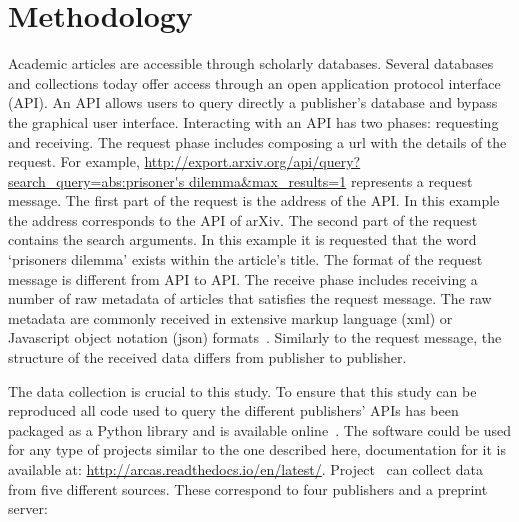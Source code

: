 \documentclass{article}
\theoremstyle{definition}
\begin{document}
\section{Methodology}\label{section:methodology}

Academic articles are accessible through scholarly databases. Several databases
and collections today offer access through an open application protocol
interface (API). An API allows users to query directly a publisher's database and
bypass the graphical user interface. Interacting with an API has two phases:
requesting and receiving. The request phase includes composing a url with the
details of the request. For example,
\url{http://export.arxiv.org/api/query?search_query=abs:prisoner's
dilemma&max_results=1} represents a request message. The first part of the
request is the address of the API. In this example the address corresponds to
the API of arXiv. The second part of the request contains the search arguments.
In this example it is requested that the word `prisoners dilemma' exists within
the article's title. The format of the request message is different from API to
API. The receive phase includes receiving a number of raw metadata of articles
that satisfies the request message. The raw metadata are commonly received in
extensive markup language (xml) or Javascript object notation (json)
formats~\cite{nurseitov2009}. Similarly to the request message, the structure of
the received data differs from publisher
to publisher.

The data collection is crucial to this study. To ensure that this study can be
reproduced all code used to query the different publishers' APIs has been packaged as a
Python library and is available online~\cite{nikoleta_2017}. The software could
be used for any type of projects similar to the one described here,
documentation for it is available at:
\url{http://arcas.readthedocs.io/en/latest/}. Project~\cite{nikoleta_2017} can
collect data from five different sources. These correspond to four
publishers and a preprint server:
\end{document}
